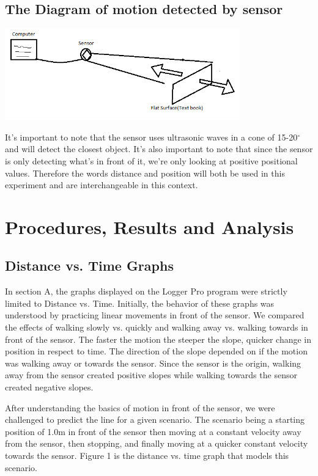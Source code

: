 \documentclass[aps,letterpaper,11pt]{revtex4}
\begin{document}
\subsection{The Diagram of motion detected by sensor}

\begin{center}
\includegraphics[width=4in]{DIAUS.png}
\end{center}

It's important to note that the sensor uses ultrasonic waves in a cone of 15-20$^\circ$ and will detect the closest object. It's also important to note that since the sensor is only detecting what's in front of it, we're only looking at positive positional values. Therefore the words distance and position will both be used in this experiment and are interchangeable in this context.  


\section{Procedures, Results and Analysis}

\subsection{Distance vs. Time Graphs}

In section A, the graphs displayed on the Logger Pro program were strictly limited to Distance vs. Time. Initially, the behavior of these graphs was understood by practicing linear movements in front of the sensor. We compared the effects of walking slowly vs. quickly and walking away vs. walking towards in front of the sensor. The faster the motion the steeper the slope, quicker change in position in respect to time. The direction of the slope depended on if the motion was walking away or towards the sensor. Since the sensor is the origin, walking away from the sensor created positive slopes while walking towards the sensor created negative slopes. 

After understanding the basics of motion in front of the sensor, we were challenged to predict the line for a given scenario. The scenario being a starting position of 1.0m in front of the sensor then moving at a constant velocity away from the sensor, then stopping, and finally moving at a quicker constant velocity towards the sensor. Figure 1 is the distance vs. time graph that models this scenario.
\end{document}
